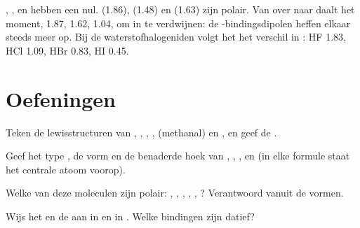 \begin{example}\label{ex:b1:lewis-resonance-vsepr:dipoles}
, ,  en  hebben een  nul.
 (\qty{1.86}{\debye}),  (\qty{1.48}{\debye}) en
 (\qty{1.63}{\debye}) zijn polair. Van  over
 naar  daalt het moment, 1.87, 1.62,
\qty{1.04}{\debye}, om in  te verdwijnen: de
-bindingsdipolen heffen elkaar steeds meer op. Bij de
waterstofhalogeniden volgt het het verschil in :
HF 1.83, HCl 1.09, HBr 0.83, HI \qty{0.45}{\debye}.
\end{example}


\section{Oefeningen}

\begin{exercise}[$\star$]\label{exo:b1:lewis-resonance-vsepr:1}
Teken de lewisstructuren van , , , ,
 (methanal) en , en geef de .
\end{exercise}

\begin{exercise}[$\star$]\label{exo:b1:lewis-resonance-vsepr:2}
Geef het type , de vorm en de benaderde hoek van ,
, ,  en  (in elke formule staat
het centrale atoom voorop).
\end{exercise}

\begin{exercise}[$\star$]\label{exo:b1:lewis-resonance-vsepr:3}
Welke van deze moleculen zijn polair: , , ,
, , ? Verantwoord vanuit de vormen.
\end{exercise}

\begin{exercise}[$\star$]\label{exo:b1:lewis-resonance-vsepr:4}
Wijs het  en de  aan in  en in
. Welke bindingen zijn datief?
\end{exercise}

